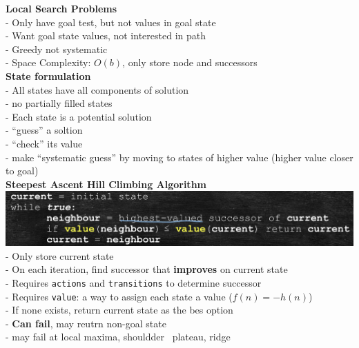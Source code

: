 \documentclass[10pt, a4paper]{article}
\newcommand{\highlight}[1]{{\color{red}\textbf{#1}}}
\newcommand{\red}[1]{{\color{red}#1}}
\newcommand{\header}[1]{{\normalsize\textbf{#1}}}
\newcommand{\tab}[0]{\hspace*{2mm}}
\begin{document}
\begin{multicols*}{3}
	  \header{Local Search Problems}\\
	  - Only have goal test, but not values in goal state\\
	  - Want goal state values, not interested in path\\
	  - Greedy \red{not} systematic\\
	  - Space Complexity: $O(b)$, only store node and successors\\

	  \textbf{State formulation}\\
	  - All states have all components of solution\\
	  \tab - no partially filled states\\
	  - Each state is a potential solution\\
	  \tab - ``guess'' a soltion\\
	  \tab - ``check'' its value\\
	  \tab - make ``systematic guess'' by moving to states of higher value (higher value closer to goal)\\

	  \textbf{Steepest Ascent Hill Climbing Algorithm}\\
	  \includegraphics[scale=0.15]{./assets/steepestAscent.jpeg}\\
	  - Only store current state\\
	  - On each iteration, find successor that \textbf{improves} on current state\\
	  \tab - Requires \red{\texttt{actions}} and \red{\texttt{transitions}} to determine successor\\
	  \tab - Requires \red{\texttt{value}}: a way to assign each state a value ($f(n) = -h(n)$)\\
	  - If none exists, return current state as the bes option\\
	  \tab - \highlight{Can fail}, may reutrn non-goal state\\
	  \tab - may fail at \red{local maxima, shouldder \ plateau, ridge}\\


\end{multicols*}
\end{document}
